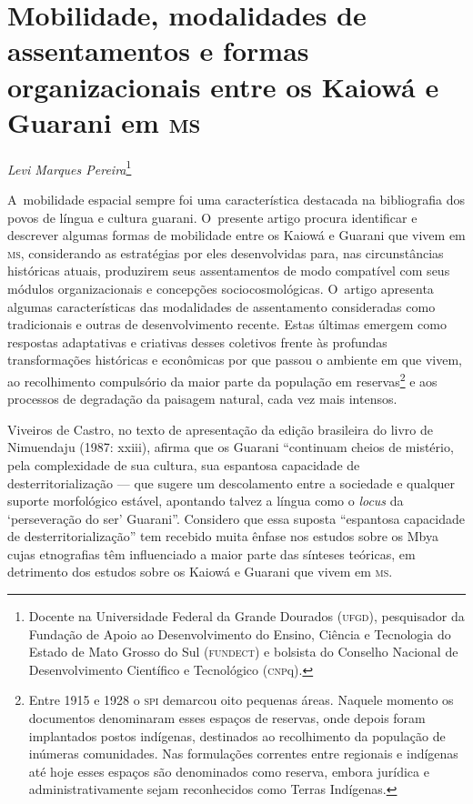 \chapter*{Mobilidade, modalidades de assentamentos e formas organizacionais entre
os Kaiowá e Guarani em \textsc{ms}}

\@openrighttrue\makeatother

\begin{flushright}
\emph{Levi Marques Pereira}\footnote{Docente na Universidade Federal da
Grande Dourados (\textsc{ufgd}), pesquisador da Fundação de Apoio ao Desenvolvimento do Ensino, Ciência e Tecnologia do Estado de Mato Grosso do Sul (\textsc{fundect}) e bolsista do Conselho Nacional de Desenvolvimento Científico e Tecnológico (\textsc{cnp}q).} 
\end{flushright}

\noindent
A~mobilidade espacial sempre foi uma característica destacada na
bibliografia dos povos de língua e cultura guarani. O~presente artigo
procura identificar e descrever algumas formas de mobilidade entre os
Kaiowá e Guarani que vivem em \textsc{ms}, considerando as estratégias por eles
desenvolvidas para, nas circunstâncias históricas atuais, produzirem
seus assentamentos de modo compatível com seus módulos organizacionais
e concepções sociocosmológicas. O~artigo apresenta algumas
características das modalidades de assentamento consideradas como
tradicionais e outras de desenvolvimento recente. Estas últimas emergem
como respostas adaptativas e criativas desses coletivos frente às
profundas transformações históricas e econômicas por que passou o
ambiente em que vivem, ao recolhimento compulsório da maior parte da
população em reservas\footnote{Entre 1915 e 1928 o \textsc{spi} demarcou oito
pequenas áreas. Naquele momento os documentos denominaram esses espaços
de reservas, onde depois foram implantados postos indígenas, destinados
ao recolhimento da população de inúmeras comunidades. Nas formulações
correntes entre regionais e indígenas até hoje esses espaços são
denominados como reserva, embora jurídica e administrativamente sejam
reconhecidos como Terras Indígenas.} e aos processos de degradação
da paisagem natural, cada vez mais intensos.

Viveiros de Castro, no texto de apresentação da edição brasileira do
livro de Nimuendaju (1987: xxiii), afirma que os Guarani ``continuam
cheios de mistério, pela complexidade de sua cultura, sua espantosa
capacidade de desterritorialização --- que sugere um descolamento entre a
sociedade e qualquer suporte morfológico estável, apontando talvez a
língua como o \emph{locus} da ‘perseveração do ser’ Guarani''. Considero que
essa suposta ``espantosa capacidade de desterritorialização'' tem
recebido muita ênfase nos estudos sobre os Mbya cujas etnografias têm
influenciado a maior parte das sínteses teóricas, em detrimento dos
estudos sobre os Kaiowá e Guarani que vivem em \textsc{ms}. 


